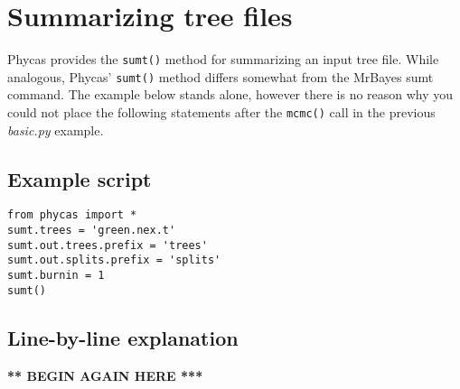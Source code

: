 \documentclass[10pt]{article}
\newcommand{\pathname}[1]{{\em #1}}			%
\begin{document}
\section{Summarizing tree files}

Phycas provides the {\tt sumt()} method for summarizing an input tree file. While analogous, Phycas' {\tt sumt()} method differs somewhat from the MrBayes sumt command. The example below stands alone, however there is no reason why you could not place the following statements after the {\tt mcmc()} call in the previous \pathname{basic.py} example.

\subsection{Example script}

\begin{verbatim}
from phycas import *
sumt.trees = 'green.nex.t'
sumt.out.trees.prefix = 'trees'
sumt.out.splits.prefix = 'splits'
sumt.burnin = 1
sumt()
\end{verbatim}

\subsection{Line-by-line explanation}

{\bf *** BEGIN AGAIN HERE ***}
\end{document}
